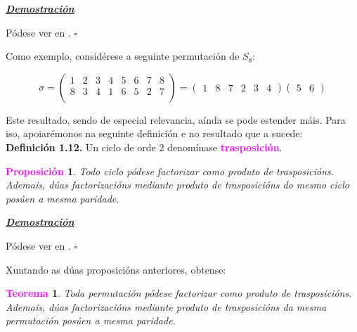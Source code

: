 \documentclass[twoside]{report}
\newcommand{\magbf}[1]{\textcolor{magenta}{\textbf{#1}}} %
\theoremstyle{mystyle}
\newtheorem{theo}{\magbf{Teorema}}[chapter]
\newtheorem{prop}{\magbf{Proposición}}[chapter]
\newenvironment{theorem}
{\begin{mdframed}[linecolor = magenta,backgroundcolor = classicrose, linewidth = 2mm]\begin{theo}}
{\end{theo}\end{mdframed}}
\newenvironment{proposition}
{\begin{mdframed}[linecolor = magenta,backgroundcolor = classicrose, linewidth = 2mm]\begin{prop}}
{\end{prop}\end{mdframed}}
\begin{document}
\noindent \textbf{\textit{\underline{Demostración}}}

\vspace{2mm}

\noindent Pódese ver en \cite{rotman}. $\square$

\vspace{5mm}

\noindent Como exemplo, considérese a seguinte permutación de $S_{8}$: 

$$
\sigma = 
\begin{pmatrix}
1 & 2 & 3 & 4 & 5 & 6 & 7 & 8 \\
8 & 3 & 4 & 1 & 6 & 5 & 2 & 7 \\
\end{pmatrix}
=
\begin{pmatrix}
1 & 8 & 7 & 2 & 3 & 4
\end{pmatrix}
\begin{pmatrix}
5 & 6
\end{pmatrix}
$$

\vspace{3mm}

\noindent Este resultado, sendo de especial relevancia, aínda se pode estender máis. Para iso, apoiarémonos na seguinte definición e no resultado que a sucede:\\

\noindent \textbf{Definición 1.12.} Un ciclo de orde 2 denomínase \textcolor{magenta}{\textbf{trasposición}}.\\

\begin{proposition} \label{prop1.6}
Todo ciclo pódese factorizar como produto de trasposicións. Ademais, dúas factorizacións mediante produto de trasposicións do mesmo ciclo posúen a mesma paridade.
\end{proposition}

\vspace{2mm}

\noindent \textbf{\textit{\underline{Demostración}}}

\vspace{2mm}

\noindent Pódese ver en \cite{rotman}. $\square$

\vspace{5mm}

\noindent Xuntando as dúas proposicións anteriores, obtense:\\

\begin{theorem} \label{th1.4}
Toda permutación pódese factorizar como produto de trasposicións. Ademais, dúas factorizacións mediante produto de trasposicións da mesma permutación posúen a mesma paridade.
\end{theorem}
\end{document}
